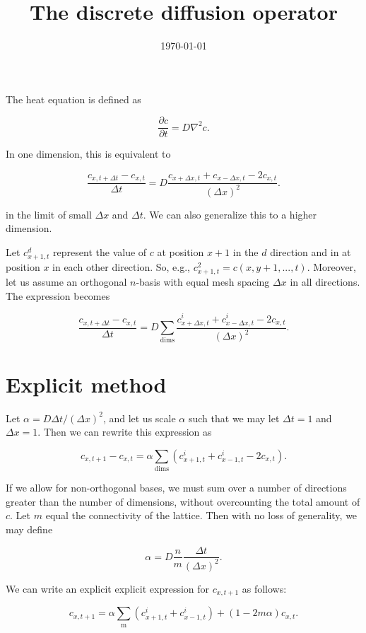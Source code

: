 \documentclass[12pt]{article}
\title{The discrete diffusion operator}
\date{\today}
\begin{document}
\maketitle

The heat equation is defined as

\begin{equation}
\frac{\partial c}{\partial t} = D \nabla^2 c.
\end{equation}

In one dimension, this is equivalent to

\begin{equation}
	\frac{c_{x, t + \Delta t} - c_{x, t}}{\Delta t} = D \frac{c_{x + \Delta x, t} + c_{x - \Delta x, t} - 2c_{x, t}}{(\Delta x)^2}.
\end{equation}

in the limit of small $\Delta x$ and $\Delta t$. We can also generalize this to a higher dimension. 

Let $c^d_{x+1, t}$ represent the value of $c$ at position $x+1$ in the $d$ direction and in at position $x$ in each other direction. So, e.g., $c^2_{x+1, t} = c(x, y+1, ..., t)$. Moreover, let us assume an orthogonal $n$-basis with equal mesh spacing $\Delta x$ in all directions. The expression becomes

\begin{equation}
	\frac{c_{x, t + \Delta t} - c_{x, t}}{\Delta t} = D \sum_{\mathrm{dims}}\frac{c^i_{x + \Delta x, t} + c^i_{x - \Delta x, t} - 2c_{x, t}}{(\Delta x)^2}.
\end{equation}

\section{Explicit method}

Let $\alpha = D \Delta t / (\Delta x)^2$, and let us scale $\alpha$ such that we may let $\Delta t=1$ and $\Delta x = 1$. Then we can rewrite this expression as

\begin{equation}
	c_{x, t + 1} - c_{x, t} = \alpha \sum_{\mathrm{dims}}\left(c^i_{x + 1, t} + c^i_{x - 1, t} - 2c_{x, t}\right).
\end{equation}


If we allow for non-orthogonal bases, we must sum over a number of directions greater than the number of dimensions, without overcounting the total amount of $c$. Let $m$ equal the connectivity of the lattice. Then with no loss of generality, we may define

\begin{equation}
	\alpha = D \frac{n}{m} \frac{\Delta t}{(\Delta x)^2}.
\end{equation}

We can write an explicit explicit expression for $c_{x, t+1}$ as follows:

\begin{equation}
	c_{x, t + 1} = \alpha \sum_{\mathrm{m}}\left(c^i_{x + 1, t} + c^i_{x - 1, t}\right) + (1-2 m \alpha) c_{x, t}.
\end{equation}
\end{document}
